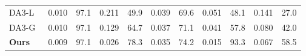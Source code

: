 \begin{table}[t]
{\begin{tabular}{l rr rr rr rr rr}
        DA3-L~\citep{lin2025depth}                              & \cellcolor{taborange}0.010 & \cellcolor{tabyellow}97.1 & 0.211 & 49.9 & 0.039 & 69.6 & 0.051 & 48.1 & 0.141 & 27.0 \\
        DA3-G~\citep{lin2025depth}                              & \cellcolor{taborange}0.010 & \cellcolor{tabyellow}97.1 & 0.129 & 64.7 & \cellcolor{tabyellow}0.037 & \cellcolor{tabyellow}71.1 & 0.041 & 57.8 & 0.080 & 42.0 \\
        \midrule
        \textbf{Ours}                                           & \cellcolor{tabred}0.009 & \cellcolor{tabyellow}97.1 & \cellcolor{taborange}0.026 & \cellcolor{taborange}78.3 & \cellcolor{taborange}0.035 & \cellcolor{taborange}74.2 & \cellcolor{taborange}0.015 & \cellcolor{taborange}93.3 & \cellcolor{taborange}0.067 & \cellcolor{taborange}58.5 \\
        \bottomrule
    \end{tabular}}
\end{table}



